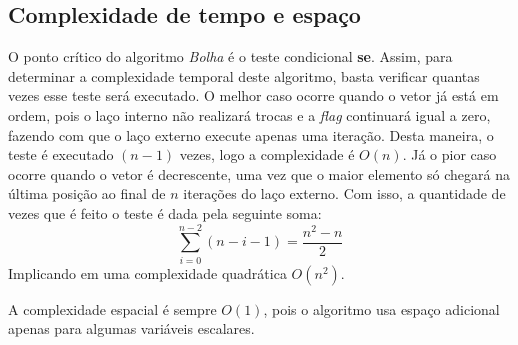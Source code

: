 \subsection{Complexidade de tempo e espaço}
O ponto crítico do algoritmo \textit{Bolha} é o teste condicional \textbf{se}. Assim, para determinar a complexidade temporal deste algoritmo, basta verificar quantas vezes esse teste será executado. O melhor caso ocorre quando o vetor já está em ordem, pois o laço interno não realizará trocas e a \textit{flag} continuará igual a zero, fazendo com que o laço externo execute apenas uma iteração. Desta maneira, o teste é executado $(n-1)$ vezes, logo a complexidade é $O(n)$. Já o pior caso ocorre quando o vetor é decrescente, uma vez que o maior elemento só chegará na última posição ao final de $n$ iterações do laço externo. Com isso, a quantidade de vezes que é feito o teste é dada pela seguinte soma:
\begin{equation}\label{eq:1}
    \sum_{i=0}^{n-2} (n-i-1) = \frac{n^2 - n}{2}
\end{equation}
Implicando em uma complexidade quadrática $O(n^2)$.

A complexidade espacial é sempre $O(1)$, pois o algoritmo usa espaço adicional apenas para algumas variáveis escalares.